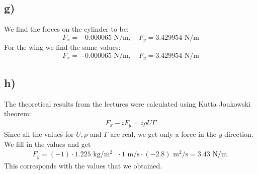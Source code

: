 \documentclass{article}
\begin{document}
\subsection*{g)}
    We find the forces on the cylinder to be:
    $$
    F_x = -0.000065 \text{ N/m}, \quad F_y = 3.429954 \text{ N/m}
    $$
    For the wing we find the same values:
    $$
    F_x = -0.000065 \text{ N/m}, \quad F_y = 3.429954 \text{ N/m}
    $$

\subsection*{h)}
    The theoretical results from the lectures were calculated using Kutta Joukowski theorem:
    \begin{align*}
        F_x - iF_y=i\rho U\Gamma
    \end{align*}
    Since all the values for $U, \rho$ and $\Gamma$ are real, we get only a force in the $y$-direction. We fill in the values and get
    \begin{align*}
        F_y = (-1) \cdot 1.225 \text{ kg/m$^2$ } \cdot 1\text{ m/s} \cdot (-2.8) \text{ m$^2$/s}= 3.43 \text{ N/m}.
    \end{align*}
    This corresponds with the values that we obtained.
\end{document}
